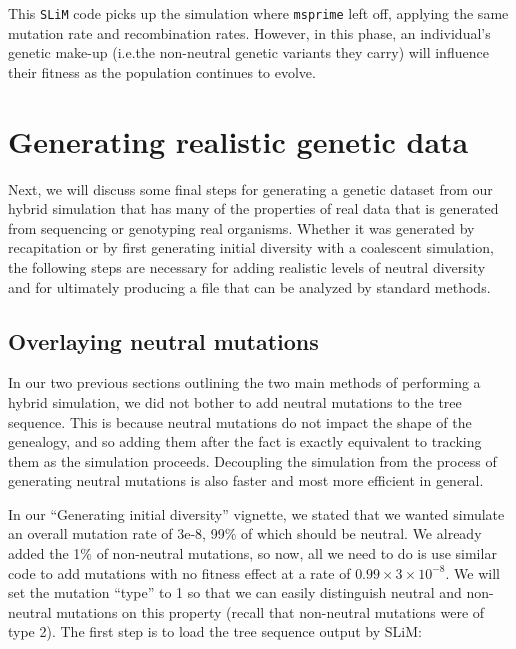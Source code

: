 \documentclass[12pt]{article}
\newcommand{\msprime}[0]{\texttt{msprime}\xspace}
\newcommand{\slim}[0]{\texttt{SLiM}\xspace}
\newcommand*{\ie}{i.e.\xcomma}
\begin{document}
This \slim code picks up the simulation where \msprime left off, applying the same mutation rate and recombination rates. However, in this phase,
an individual's genetic make-up (\ie the non-neutral genetic variants they carry) will influence their fitness as the population continues to evolve.

\section{Generating realistic genetic data}

Next, we will discuss some final steps for generating a genetic dataset from our hybrid simulation that has many of the properties of real data that is generated from
sequencing or genotyping real organisms. Whether it was generated by recapitation or by first generating initial
diversity with a coalescent simulation, the following steps are necessary for adding realistic levels of neutral diversity and for ultimately producing a
file that can be analyzed by standard methods.

\subsection {Overlaying neutral mutations}

In our two previous sections outlining the two main methods of performing a hybrid simulation, we did not bother to add neutral mutations to the tree sequence.
This is because neutral mutations do not impact the shape of the genealogy, and so adding them after the fact is exactly equivalent to tracking them as the
simulation proceeds. Decoupling the simulation from the process of generating neutral mutations is also faster and most more efficient in general.

In our ``Generating initial diversity'' vignette, we stated that we wanted simulate an overall mutation rate of 3e-8, 99\% of which should be neutral.
We already added the 1\% of non-neutral mutations, so now, all we need to do is use similar code to add mutations with no fitness effect at
a rate of $0.99 \times 3 \times10^{-8}$. We will set the mutation ``type'' to 1 so that we can easily distinguish neutral and non-neutral
mutations on this property (recall that non-neutral mutations were of type 2). The first step is to load the tree sequence output by SLiM:
   
\end{document}
